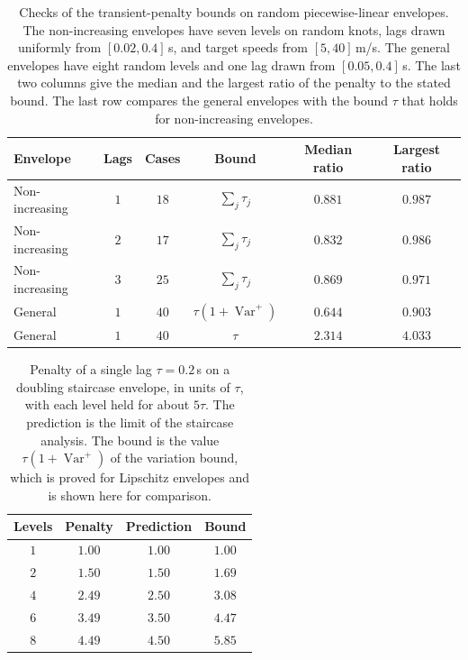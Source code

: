 \begin{table}[htbp]
\centering\small
\caption{Checks of the transient-penalty bounds on random piecewise-linear envelopes. The non-increasing envelopes have seven levels on random knots, lags drawn uniformly from $[0.02,0.4]$\,s, and target speeds from $[5,40]$\,m/s. The general envelopes have eight random levels and one lag drawn from $[0.05,0.4]$\,s. The last two columns give the median and the largest ratio of the penalty to the stated bound. The last row compares the general envelopes with the bound $\tau$ that holds for non-increasing envelopes.}\label{tab:app-transient}
\begin{tabular}{lccccc}
\toprule
Envelope & Lags & Cases & Bound & Median ratio & Largest ratio\\
\midrule
Non-increasing & $1$ & $18$ & $\sum_j\tau_j$ & $0.881$ & $0.987$\\
Non-increasing & $2$ & $17$ & $\sum_j\tau_j$ & $0.832$ & $0.986$\\
Non-increasing & $3$ & $25$ & $\sum_j\tau_j$ & $0.869$ & $0.971$\\
General & $1$ & $40$ & $\tau(1+\operatorname{Var}^+)$ & $0.644$ & $0.903$\\
General & $1$ & $40$ & $\tau$ & $2.314$ & $4.033$\\
\bottomrule
\end{tabular}
\end{table}

\begin{table}[htbp]
\centering\small
\caption{Penalty of a single lag $\tau=0.2$\,s on a doubling staircase envelope, in units of $\tau$, with each level held for about $5\tau$. The prediction is the limit of the staircase analysis. The bound is the value $\tau(1+\operatorname{Var}^+)$ of the variation bound, which is proved for Lipschitz envelopes and is shown here for comparison.}\label{tab:app-staircase}
\begin{tabular}{cccc}
\toprule
Levels & Penalty & Prediction & Bound\\
\midrule
$1$ & $1.00$ & $1.00$ & $1.00$\\
$2$ & $1.50$ & $1.50$ & $1.69$\\
$4$ & $2.49$ & $2.50$ & $3.08$\\
$6$ & $3.49$ & $3.50$ & $4.47$\\
$8$ & $4.49$ & $4.50$ & $5.85$\\
\bottomrule
\end{tabular}
\end{table}

